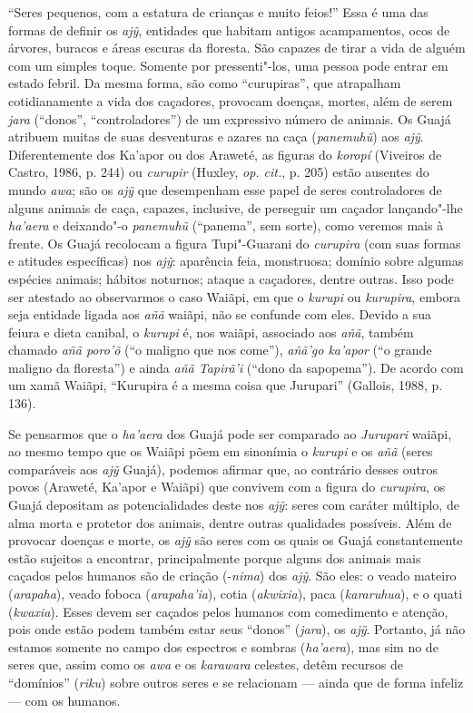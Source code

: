``Seres pequenos, com a estatura de crianças e muito feios!'' Essa é uma
das formas de definir os \emph{ajỹ}, entidades que habitam antigos
acampamentos, ocos de árvores, buracos e áreas escuras da floresta. São
capazes de tirar a vida de alguém com um simples toque. Somente por
pressenti"-los, uma pessoa pode entrar em estado febril. Da mesma forma,
são como ``curupiras'', que atrapalham cotidianamente a vida dos
caçadores, provocam doenças, mortes, além de serem \emph{jara} (``donos'',
``controladores'') de um expressivo número de animais. Os Guajá atribuem
muitas de suas desventuras e azares na caça (\emph{panemuhũ}) aos
\emph{ajỹ}. Diferentemente dos Ka'apor ou dos Araweté, as figuras do
\emph{koropí} (Viveiros de Castro, 1986, p. 244) ou \emph{curupir}
(Huxley, \emph{op. cit.}, p. 205) estão ausentes do mundo \emph{awa}; são os
\emph{ajỹ} que desempenham esse papel de seres controladores de alguns
animais de caça, capazes, inclusive, de perseguir um caçador
lançando"-lhe \emph{ha'aera} e deixando"-o \emph{panemuhũ} (``panema'', sem
sorte), como veremos mais à frente. Os Guajá recolocam a figura
Tupi"-Guarani do \emph{curupira} (com suas formas e atitudes específicas)
nos \emph{ajỹ}: aparência feia, monstruosa; domínio sobre algumas
espécies animais; hábitos noturnos; ataque a caçadores, dentre outras.
Isso pode ser atestado ao observarmos o caso Waiãpi, em que o
\emph{kurupi} ou \emph{kurupira}, embora seja entidade ligada aos
\emph{añã} waiãpi, não se confunde com eles. Devido a sua feiura e dieta
canibal, o \emph{kurupi} é, nos waiãpi, associado aos \emph{añã}, também
chamado \emph{añã poro'õ} (``o maligno que nos come''), \emph{añã'go
ka'apor} (``o grande maligno da floresta'') e ainda \emph{añã Tapirã'i}
(``dono da sapopema''). De acordo com um xamã Waiãpi, ``Kurupira é a mesma
coisa que Jurupari'' (Gallois, 1988, p. 136).

Se pensarmos que o \emph{ha'aera} dos Guajá pode ser comparado ao
\emph{Jurupari} waiãpi, ao mesmo tempo que os Waiãpi põem em sinonímia o
\emph{kurupi} e os \emph{añã} (seres comparáveis aos \emph{ajỹ} Guajá),
podemos afirmar que, ao contrário desses outros povos (Araweté, Ka'apor
e Waiãpi) que convivem com a figura do \emph{curupira}, os Guajá
depositam as potencialidades deste nos \emph{ajỹ}: seres com caráter
múltiplo, de alma morta e protetor dos animais, dentre outras qualidades
possíveis. Além de provocar doenças e morte, os \emph{ajỹ} são seres com
os quais os Guajá constantemente estão sujeitos a encontrar,
principalmente porque alguns dos animais mais caçados pelos humanos são
de criação (-\emph{nima}) dos \emph{ajỹ}. São eles: o veado mateiro
(\emph{arapaha}), veado foboca (\emph{arapaha'ia}), cotia
(\emph{akwixia}), paca (\emph{kararuhua}), e o quati (\emph{kwaxia}).
Esses devem ser caçados pelos humanos com comedimento e atenção, pois
onde estão podem também estar seus ``donos'' (\emph{jara}), os \emph{ajỹ}.
Portanto, já não estamos somente no campo dos espectros e sombras
(\emph{ha'aera}), mas sim no de seres que, assim como os \emph{awa} e os
\emph{karawara} celestes, detêm recursos de ``domínios'' (\emph{riku})
sobre outros seres e se relacionam --- ainda que de forma infeliz --- com os
humanos.

